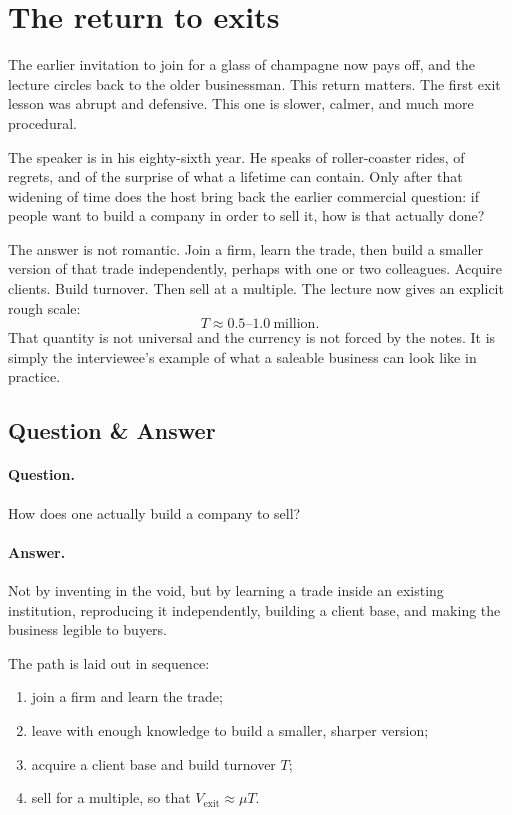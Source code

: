\section{The return to exits}

The earlier invitation to join for a glass of champagne now pays off, and the lecture circles back to the older businessman. This return matters. The first exit lesson was abrupt and defensive. This one is slower, calmer, and much more procedural.

The speaker is in his eighty-sixth year. He speaks of roller-coaster rides, of regrets, and of the surprise of what a lifetime can contain. Only after that widening of time does the host bring back the earlier commercial question: if people want to build a company in order to sell it, how is that actually done?

The answer is not romantic. Join a firm, learn the trade, then build a smaller version of that trade independently, perhaps with one or two colleagues. Acquire clients. Build turnover. Then sell at a multiple. The lecture now gives an explicit rough scale:
\begin{equation}
T \approx 0.5\text{--}1.0\ \text{million}.
\end{equation}
That quantity is not universal and the currency is not forced by the notes. It is simply the interviewee's example of what a saleable business can look like in practice.

\subsection{Question \& Answer}

\paragraph{Question.} How does one actually build a company to sell?

\paragraph{Answer.} Not by inventing in the void, but by learning a trade inside an existing institution, reproducing it independently, building a client base, and making the business legible to buyers.

The path is laid out in sequence:
\begin{enumerate}
\item join a firm and learn the trade;
\item leave with enough knowledge to build a smaller, sharper version;
\item acquire a client base and build turnover \(T\);
\item sell for a multiple, so that \(V_{\mathrm{exit}} \approx \mu T\).
\end{enumerate}

